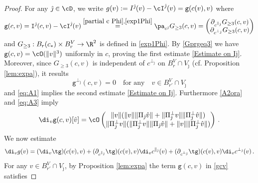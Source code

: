 \documentclass[11pt,a4paper,reqno]{article}
\numberwithin{equation}{section}
\theoremstyle{definition}
\begin{document}
\begin{proof}
For any $ {\hat \jmath} \in \cD $,  we write 
$ g(v) :=  I^{\hat \jmath}(v) - \cI^{\hat \jmath}(v)  = 
{\mathtt g}(c(v),v) 
$ 
where
\begin{equation}\label{gcv}
{\mathtt g}(c,v) 
= {\mathtt I}^{\hat \jmath}(c,v)- \cI^{\hat \jmath} (v) 
\stackrel{\eqref{partial c Phi},\eqref{exp1Phi}} 
=  \pa_{c^{\hat \jmath}} G_{\geq 3}(c,v)
= \begin{pmatrix}
            \partial_{c^{\parallel_{\hat \jmath}}} G_{\geq 3}(c,v)\\
            \partial_{c^{\bot_{\hat \jmath}}} G_{\geq 3}(c,v)
        \end{pmatrix} 
\end{equation}
and  $G_{\geq 3}:B_{r}(c_*)\times B_{r}^V\to \R^2$ is   defined in \eqref{exp1Phi}.
    By \eqref{Gprgeq3} we have ${\mathtt g}(c,v) =\cO(\|v\|^3) $ uniformly in $ c $,  
    proving 
    the first estimate  \eqref{Estimate on Ij}.  
    Moreover, since $ G_{\geq 3}(c,v) $ is independent of $ c^{\bot_{\hat \jmath}} $ on $B_{r}^V\cap V_{\hat \jmath}$ (cf. Proposition \ref{lem:expa}),  it results %
    \begin{equation}\label{eq:property of g(c,v)}
        {\mathtt g}^{\bot_{\hat \jmath}}(c,v)=0 \quad \text{for any} \quad   v\in B_{r'}^V\cap V_{\hat \jmath} 
    \end{equation}
        and  \eqref{eq:A1} implies the second 
    estimate  \eqref{Estimate on Ij}. 
   Furthermore \eqref{A2ora} and \eqref{eq:A3} 
   imply 
\begin{equation}\label{eq:gs1}
        \di_v {\mathtt g} (c,v)[\hat v]=\cO\begin{pmatrix}
            \|v\|(\|v\|\|\Pi_{\hat \jmath} \hat v\|+\|\Pi_{\hat \jmath}^\bot v\|\|\Pi_{\hat \jmath}^\bot \hat v\|)\\
            \|\Pi_{\hat \jmath}^\bot v\|(\|\Pi_{\hat \jmath}^\bot v\|\|\Pi_{\hat \jmath} \hat v\|+\|v\|\|\Pi_{\hat \jmath}^\bot \hat v\|)
        \end{pmatrix}\, .
\end{equation}
    We now estimate    
\begin{equation}\label{eq:gcomp}
\di_v g(v)  =(\di_v \tg)(c(v),v) +(\partial_{c^{\parallel_{\hat \jmath}}}\tg)(c(v),v)\di_v c^{\parallel_{\hat\jmath}}(v) 
+(\partial_{c^{\bot_{\hat \jmath}}}\tg)(c(v),v)\di_v c^{\bot_{\hat\jmath}}(v) \,.
\end{equation}
    For any $ v\in B_{r'}^V\cap V_{\hat \jmath}$, by Proposition \ref{lem:expa} the term $ {\mathtt g}(c,v) $ in \eqref{gcv} satisfies

\end{proof}
\end{document}
